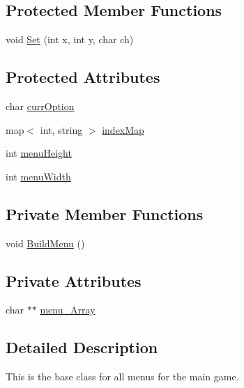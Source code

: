 \subsection*{Protected Member Functions}
\begin{DoxyCompactItemize}
\item 
void \hyperlink{classMenu_aa13913062e78fbd036ca698e0c0c5038}{Set} (int x, int y, char ch)
\end{DoxyCompactItemize}
\subsection*{Protected Attributes}
\begin{DoxyCompactItemize}
\item 
char \hyperlink{classMenu_a8cabd1390fcc59aba53b79788915c792}{curr\-Option}
\item 
map$<$ int, string $>$ \hyperlink{classMenu_a6761c21ec3e1d3a5295479443e7c1a90}{index\-Map}
\item 
int \hyperlink{classMenu_ad9364e391e91acd266444a2604cb838e}{menu\-Height}
\item 
int \hyperlink{classMenu_a5c90eda61cd9071dcafda04569dfdd67}{menu\-Width}
\end{DoxyCompactItemize}
\subsection*{Private Member Functions}
\begin{DoxyCompactItemize}
\item 
void \hyperlink{classMenu_aaae232bbb2e874c2abb18b470259ab33}{Build\-Menu} ()
\end{DoxyCompactItemize}
\subsection*{Private Attributes}
\begin{DoxyCompactItemize}
\item 
char $\ast$$\ast$ \hyperlink{classMenu_a6fdd29d716c7fb985f038ddde93794a0}{menu\-\_\-\-Array}
\end{DoxyCompactItemize}


\subsection{Detailed Description}
This is the base class for all menus for the main game. 

